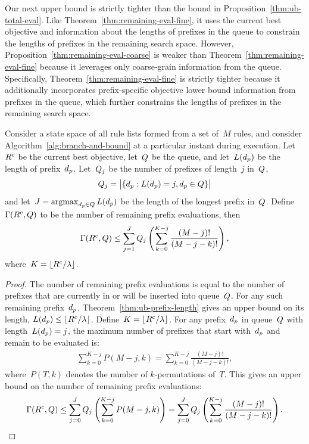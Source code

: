Our next upper bound is strictly tighter than the bound in
Proposition~\ref{thm:ub-total-eval}.
%
Like Theorem~\ref{thm:remaining-eval-fine}, it uses the
current best objective and information about
the lengths of prefixes in the queue to constrain
the lengths of prefixes in the remaining search space.
%
However, Proposition~\ref{thm:remaining-eval-coarse}
is weaker than Theorem~\ref{thm:remaining-eval-fine} because
it leverages only coarse-grain information from the queue.
%
Specifically, Theorem~\ref{thm:remaining-eval-fine} is
strictly tighter because it additionally incorporates
prefix-specific objective lower bound information from
prefixes in the queue, which further constrains
the lengths of prefixes in the remaining search space.

\begin{proposition}
\label{thm:remaining-eval-coarse}
Consider a state space of all rule lists formed from a set of~$M$ rules,
and consider Algorithm~\ref{alg:branch-and-bound} at a particular instant
during execution.
%
Let~${R^c}$ be the current best objective, let~$Q$ be the queue,
and let~$L(d_p)$ be the length of prefix~$d_p$.
%
Let~$Q_j$ be the number of prefixes of length~$j$ in~$Q$,
\begin{align}
\Queue_j = \big | \{ \Prefix : L(\Prefix) = j, \Prefix \in \Queue \} \big |
\end{align}
and let~${J = \operatorname*{argmax}_{d_p \in Q} L(d_p)}$
be the length of the longest prefix in~$Q$.
%
Define~${\Gamma({R^c}, Q)}$ to be the number of remaining
prefix evaluations, then
\begin{align}
\Remaining(\CurrentObj, \Queue)
\le \sum_{j=1}^J \Queue_j \left( \sum_{k=0}^{K-j} \frac{(M-j)!}{(M-j - k)!} \right),
\end{align}
where~${K = \lfloor {R^c} / {\lambda} \rfloor}$.
\end{proposition}

\begin{proof}
The number of remaining prefix evaluations is equal to the number of
prefixes that are currently in or will be inserted into queue~$Q$.
%
For any such remaining prefix~$d_p$,
Theorem~\ref{thm:ub-prefix-length} gives an upper bound on its length,
${L(d_p) \le \lfloor {R^c} / {\lambda} \rfloor}$.
%
Define~${K = \lfloor {R^c} / {\lambda} \rfloor}$.
%
For any prefix~$d_p$ in queue~$Q$ with length~${L(d_p) = j}$,
the maximum number of prefixes that start with~$d_p$
and remain to be evaluated is:
\begin{align}
\sum_{k=0}^{K-j} P(M-j, k) = \sum_{k=0}^{K-j} \frac{(M-j)!}{(M-j - k)!},
\end{align}
where~${P(T, k)}$ denotes the number of $k$-permutations of~$T$.
%
This gives an upper bound on the number of remaining prefix evaluations:
\begin{align}
\Remaining(\CurrentObj, \Queue)
\le \sum_{j=0}^J \Queue_j \left( \sum_{k=0}^{K-j} P(M-j, k) \right)
= \sum_{j=0}^J \Queue_j \left( \sum_{k=0}^{K-j} \frac{(M-j)!}{(M-j - k)!} \right).
\end{align}
\end{proof}

